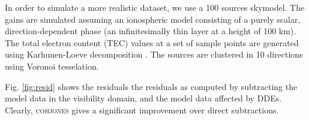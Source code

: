 In order to simulate a more realistic dataset, we use a 100 sources
skymodel. The gains are simulated assuming an ionospheric
model consisting
of a purely scalar, direction-dependent phase (an infinitesimally thin layer at a height of 100 km). The
total electron content (TEC) values at a set of sample points are
generated using Karhunen-Loeve decomposition \citep[the spatial correlation
is given by Kolmogorov turbulence, see][]{Tol09}. The sources are clustered in 10 directions using Voronoi
tesselation.

Fig. \ref{fig:resid} shows the residuals the residuals as
computed by subtracting the model data in the visibility domain, and
the model data affected by DDEs. Clearly, \textsc{cohjones} gives a
significant improvement over direct subtractions.





